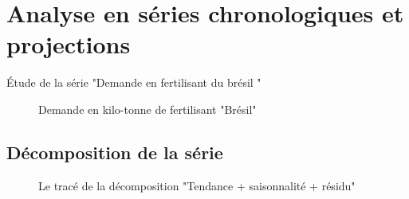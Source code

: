	\section{Analyse en séries chronologiques et projections}
	Étude de la série "Demande en fertilisant du brésil "
	\begin{figure}[H]
		\centering
		\caption{Demande en kilo-tonne de fertilisant "Brésil"}
		\label{fig:dem}
	\end{figure}
	\subsection{Décomposition de la série}
	\begin{figure}[H]
		\centering
		\caption{Le tracé de la décomposition "Tendance + saisonnalité + résidu"}
		\label{fig:dec}
	\end{figure}

